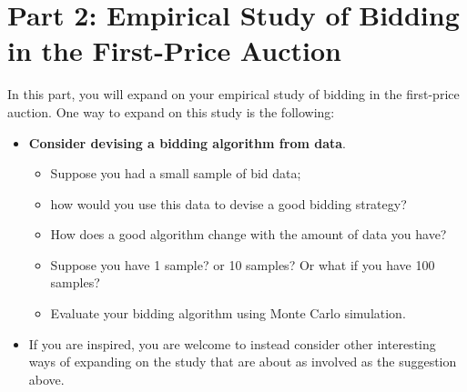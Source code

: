 \documentclass[11pt]{article}
\begin{document}
\section*{Part 2: Empirical Study of Bidding in the First-Price Auction}
In this part, you will expand on your empirical study of bidding in the first-price auction. One way to expand on this study is the following:
\begin{itemize}
    \item  \textbf{Consider devising a bidding algorithm from data}.
    \begin{itemize}
        \item Suppose you had a small sample of bid data; 
        \item how would you use this data to devise a good bidding strategy? 
        \item How does a good algorithm change with the amount of data you have?
        \item Suppose you have 1 sample?  or 10 samples?  Or what if you have 100 samples?  \item Evaluate your bidding algorithm using Monte Carlo simulation.
        
    \end{itemize}
    \item If you are inspired, you are welcome to instead consider other interesting ways of expanding on the study that are about as involved as the suggestion above.  
\end{itemize}
\end{document}
